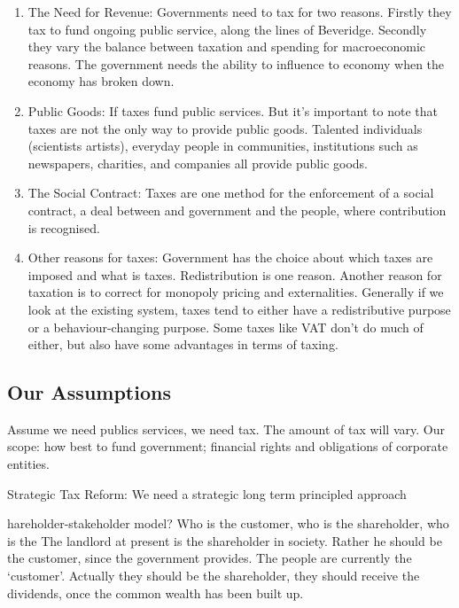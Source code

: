 \documentclass[]{tufte-handout}
\begin{document}
\begin{enumerate}
\def\labelenumi{\arabic{enumi}.}
\item
  The Need for Revenue: Governments need to tax for two reasons. Firstly
  they tax to fund ongoing public service, along the lines of Beveridge.
  Secondly they vary the balance between taxation and spending for
  macroeconomic reasons. The government needs the ability to influence
  to economy when the economy has broken down.
\item
  Public Goods: If taxes fund public services. But it's important to
  note that taxes are not the only way to provide public goods. Talented
  individuals (scientists artists), everyday people in communities,
  institutions such as newspapers, charities, and companies all provide
  public goods.
\item
  The Social Contract: Taxes are one method for the enforcement of a
  social contract, a deal between and government and the people, where
  contribution is recognised.
\item
  Other reasons for taxes: Government has the choice about which taxes
  are imposed and what is taxes. Redistribution is one reason. Another
  reason for taxation is to correct for monopoly pricing and
  externalities. Generally if we look at the existing system, taxes tend
  to either have a redistributive purpose or a behaviour-changing
  purpose. Some taxes like VAT don't do much of either, but also have
  some advantages in terms of taxing.
\end{enumerate}

\hypertarget{our-assumptions}{%
\subsection{Our Assumptions}\label{our-assumptions}}

Assume we need publics services, we need tax. The amount of tax will
vary. Our scope: how best to fund government; financial rights and
obligations of corporate entities.

Strategic Tax Reform: We need a strategic long term principled approach

hareholder-stakeholder model? Who is the customer, who is the
shareholder, who is the The landlord at present is the shareholder in
society. Rather he should be the customer, since the government
provides. The people are currently the `customer'. Actually they should
be the shareholder, they should receive the dividends, once the common
wealth has been built up.
\end{document}
